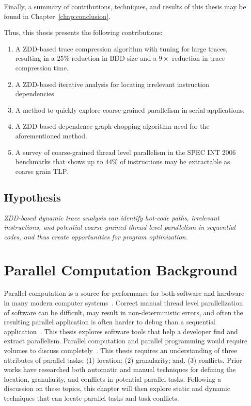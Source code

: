 \documentclass[defaultstyle,11pt]{thesis}
\begin{document}
Finally, a summary of contributions, techniques, and results of this
thesis may be found in Chapter~\ref{chap:conclusion}.

Thus, this thesis presents the following contributions:

\begin{enumerate}
\item A ZDD-based trace compression algorithm with tuning for large
  traces, resulting in a 25\% reduction in BDD size and a $9\times$
  reduction in trace compression time.
\item A ZDD-based iterative analysis for locating irrelevant
  instruction dependencies
\item A method to quickly explore coarse-grained parallelism in serial
  applications.
\item A ZDD-based dependence graph chopping algorithm need for the
  aforementioned method.
\item A survey of coarse-grained thread level parallelism in the SPEC
  INT 2006 benchmarks that shows up to 44\% of instructions may be
  extractable as coarse grain TLP.
\end{enumerate}

\section{Hypothesis}

\emph{ZDD-based dynamic trace analysis can identify hot-code paths,
  irrelevant instructions, and potential coarse-grained thread level
  parallelism in sequential codes, and thus create opportunities for
  program optimization.}


\chapter{Parallel Computation Background}
\label{chap:parallelBackground}

Parallel computation is a source for performance for both software and
hardware in many modern computer
systems~\cite{ali-reza:2007:ppopp,intel:2005:dual, intel:2005:dual2}.
Correct manual thread level parallelization of software can be
difficult, may result in non-deterministic errors, and often the
resulting parallel application is often harder to debug than a
sequential
application~\cite{herlihy:2008:art,lamport:1978:tco,fridge:88:padd}. This
thesis explores software tools that help a developer find and extract
parallelism. Parallel computation and parallel programming would
require volumes to discuss
completely~\cite{lea:1996:cpij,herlihy:2008:art}.  This thesis
requires an understanding of three attributes of parallel tasks: (1)
location; (2) granularity; and, (3) conflicts.   Prior works have
researched both automatic and manual techniques for defining the
location, granularity, and conflicts in potential parallel tasks.
Following a discussion on these topics, this chapter will then explore
static and dynamic techniques that can locate parallel tasks and task
conflicts.
\end{document}
